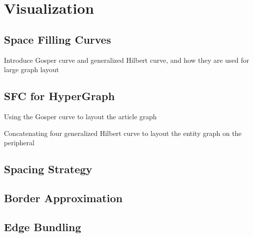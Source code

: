 \section{Visualization}
\subsection{Space Filling Curves}
Introduce Gosper curve and generalized Hilbert curve, and how they are used for large graph layout

\subsection{SFC for HyperGraph}
Using the Gosper curve to layout the article graph

Concatenating four generalized Hilbert curve to layout the entity graph on the peripheral
\subsection{Spacing Strategy}

\subsection{Border Approximation}

\subsection{Edge Bundling}

